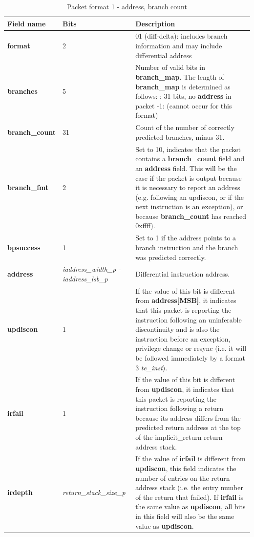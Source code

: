 \begin{table}[htp]
  \centering
  \caption{Packet format 1 - address, branch count}
  \label{tab:te_inst1-addr-count}
  \begin{tabulary}{\textwidth}{|l|p{35mm}|p{90mm}|}
    \hline
    {\bf Field name} & {\bf Bits} & {\bf Description} \\
    \hline
    \textbf{format}	& 2	& 01 (diff-delta): includes branch information and may include differential address\\
    \hline
    \textbf{branches} & 5 & Number of valid bits in \textbf{branch\_map}. The length of \textbf{branch\_map} is determined as follows: :    31 bits, no \textbf{address} in packet -1: (cannot occur for this format) \\
    \hline
    \textbf{branch\_count} & 31 & Count of the number of correctly predicted branches, minus 31. \\
    \hline
    \textbf{branch\_fmt} & 2 & Set to 10, indicates that the packet contains a \textbf{branch\_count} field and
     an \textbf{address} field. This will be the case if the packet is output because it is necessary to report an
     address (e.g. following an updiscon, or if the next instruction is an exception), or because \textbf{branch\_count} 
     has reached 0xffff).\\
    \hline
    \textbf{bpsuccess} & 1 & Set to 1 if the address points to a branch instruction and the branch was predicted correctly.  \\
    \hline
    \textbf{address}	& \textit {iaddress\_width\_p - iaddress\_lsb\_p} & 
                Differential instruction address.\\
    \hline
    \textbf{updiscon}	& 1 & 
                If the value of this bit is different from \textbf{address[MSB]}, it indicates that this 
                packet is reporting the instruction following an uninferable discontinuity and is also the 
                instruction before an exception, privilege change or resync 
                (i.e. it will be followed immediately by a format 3 \textit{te\_inst}).\\
    \hline
    \textbf{irfail}	& 1 & 
                If the value of this bit is different from \textbf{updiscon}, it indicates that this
                packet is reporting the instruction following a return because its address differs from 
                the predicted return address at the top of the implicit\_return return address stack.\\
    \hline
    \textbf{irdepth}	& \textit {return\_stack\_size\_p} & 
                If the value of \textbf{irfail} is different from \textbf{updiscon}, this field indicates 
                the number of entries on the return address stack (i.e. the entry number of the return that
                failed).  If \textbf{irfail} is the same value as \textbf{updiscon}, all bits in this field 
                will also be the same value as \textbf{updiscon}. \\
    \hline
  \end{tabulary}
\end{table}

